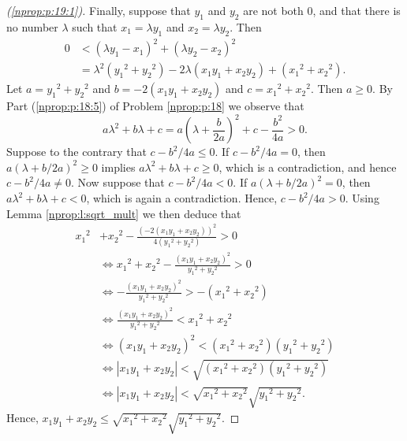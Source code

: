 \begin{proof}[(\ref{nprop:p:19:1})]
	Finally, suppose that $y_1$ and $y_2$ are not both 0, and that there is no number $\lambda$ such that $x_1 = \lambda y_1$ and $x_2 = \lambda y_2$. Then
	\begin{align*}
		0 & < (\lambda y_1 - x_1)^2 + (\lambda y_2 - x_2)^2                                            \\
		  & = \lambda^2 (y_1{ }^2 + y_2{ }^2) - 2 \lambda (x_1 y_1 + x_2 y_2) + (x_1{ }^2  +x_2{ }^2).
	\end{align*}
	Let $a = y_1{ }^2 + y_2{ }^2$ and $b = -2(x_1 y_1 + x_2 y_2)$ and $c = x_1{ }^2 + x_2{ }^2$. Then $a \geq 0$. By Part (\ref{nprop:p:18:5}) of Problem \ref{nprop:p:18} we observe that
	$$
		a \lambda^2 + b \lambda + c = a \left( \lambda + \frac{b}{2 a} \right)^2 + c - \frac{b^2}{4 a} > 0.
	$$
	Suppose to the contrary that $c - b^2 / 4 a \leq 0$. If $c - b^2 / 4 a = 0$, then $a \left( \lambda + b / 2 a \right)^2 \geq 0$ implies $a \lambda^2 + b \lambda + c \geq 0$, which is a contradiction, and hence  $c - b^2 / 4 a \neq 0$. Now suppose that $c - b^2 / 4 a < 0$. If $a \left( \lambda + b / 2 a \right)^2 = 0$, then $a \lambda^2 + b \lambda + c < 0$, which is again a contradiction. Hence, $c - b^2 / 4 a > 0$. Using Lemma \ref{nprop:l:sqrt_mult} we then deduce that
	\begin{align*}
		x_1{ }^2 & + x_2{ }^2 - \frac{(-2(x_1 y_1 + x_2 y_2))^2}{4(y_1{ }^2 + y_2{ }^2)} > 0         \\
		         & \iff x_1{ }^2 + x_2{ }^2 - \frac{(x_1 y_1 + x_2 y_2)^2}{y_1{ }^2 + y_2{ }^2} > 0  \\
		         & \iff - \frac{(x_1 y_1 + x_2 y_2)^2}{y_1{ }^2 + y_2{ }^2} > -(x_1{ }^2 + x_2{ }^2) \\
		         & \iff \frac{(x_1 y_1 + x_2 y_2)^2}{y_1{ }^2 + y_2{ }^2} < x_1{ }^2 + x_2{ }^2      \\
		         & \iff (x_1 y_1 + x_2 y_2)^2 < (x_1{ }^2 + x_2{ }^2)(y_1{ }^2 + y_2{ }^2)           \\
		         & \iff |x_1 y_1 + x_2 y_2| < \sqrt{(x_1{ }^2 + x_2{ }^2)(y_1{ }^2 + y_2{ }^2)}      \\
		         & \iff |x_1 y_1 + x_2 y_2| < \sqrt{x_1{ }^2 + x_2{ }^2} \sqrt{y_1{ }^2 + y_2{ }^2}.
	\end{align*}
	Hence, $x_1 y_1 + x_2 y_2 \leq \sqrt{x_1{ }^2 + x_2{ }^2} \sqrt{y_1{ }^2 + y_2{ }^2}$.
\end{proof}


